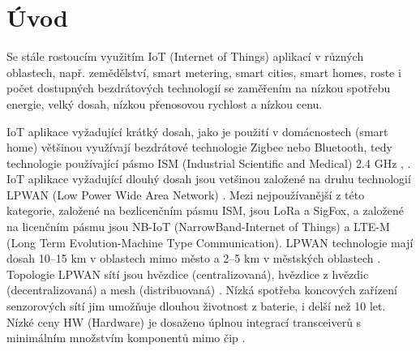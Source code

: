 \chapter{Úvod}
Se stále rostoucím využitím IoT (Internet of Things) aplikací v různých oblastech, např. zemědělství, smart metering, smart cities, smart homes, roste i počet dostupných bezdrátových technologií se zaměřením na 
nízkou spotřebu energie, velký dosah, nízkou přenosovou rychlost a nízkou cenu.

IoT aplikace vyžadující krátký dosah, jako je použití v domácnostech (smart home) většinou využívají bezdrátové technologie Zigbee nebo Bluetooth, tedy technologie používající pásmo ISM (Industrial Scientific and Medical) 2.4 GHz \cite{Design and Implementation of an IoT Assisted Real Time ZigBee Mesh WSN}, \cite{Internet of Things (IoT) for building Smart Home System}.
IoT aplikace vyžadující dlouhý dosah jsou vetšinou založené na druhu technologií LPWAN (Low Power Wide Area Network) \cite{A comparative study of LPWAN technologies for large-scale IoTdeployment}. Mezi nejpoužívanější z této kategorie, založené na bezlicenčním pásmu ISM, jsou LoRa a SigFox, a založené na licenčním pásmu jsou NB-IoT (NarrowBand-Internet of Things) a LTE-M (Long Term Evolution-Machine Type Communication).
LPWAN technologie mají dosah 10–15 km v oblastech mimo město a 2–5 km v městských oblastech \cite{Long-Range Communications in Unlicensed Bands}. Topologie LPWAN sítí jsou hvězdice (centralizovaná), hvězdice z hvězdic (decentralizovaná) a mesh (distribuovaná) \cite{high density LPWAN}.
Nízká spotřeba koncových zařízení senzorových sítí jim umožňuje dlouhou životnost z baterie, i delší než 10 let.
Nízké ceny HW (Hardware) je dosaženo úplnou integrací transceiverů s minimálním množstvím komponentů mimo čip \cite{MURS Band for LPWAN Applications}. 


